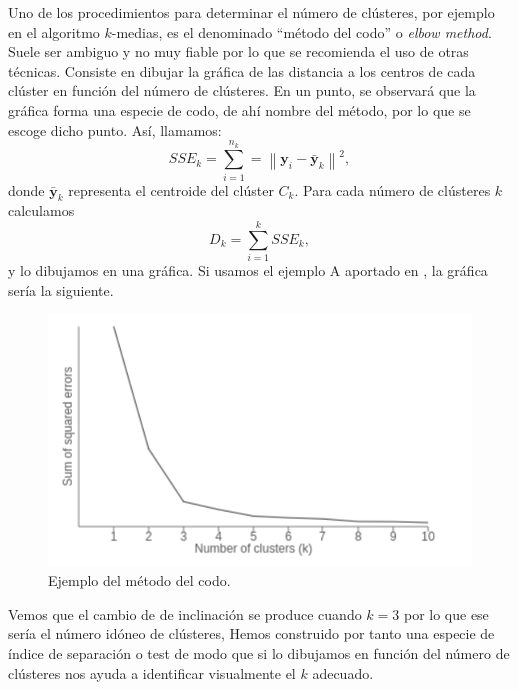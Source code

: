 \documentclass[a4paper, 20pt]{article}
\newcommand{\norm}[1]{\left\lVert#1\right\rVert}
\newcommand{\yy}{\textbf{y}}
\begin{document}
{Uno de los procedimientos para determinar el número de clústeres, por ejemplo en el algoritmo $ k$-medias, es el denominado ``método del codo'' o \textit{elbow method}. Suele ser ambiguo y no muy fiable por lo que se recomienda el uso de otras técnicas. Consiste en dibujar la gráfica de las distancia a los centros de cada clúster en función del número de clústeres. En un punto, se observará que la gráfica forma una especie de codo, de ahí nombre del método, por lo que se escoge dicho punto. Así, llamamos:\\
\[
SSE_k = \sum_{i = 1}^{n_k} = \norm{\yy_i - \bar{\yy}_k}^2,
\]
donde $ \bar{\yy}_k $ representa el centroide del clúster $ C_k $. Para cada número de clústeres $ k $ calculamos 
\[
D_k = \sum_{i = 1} ^ {k} SSE_k,
\]
y lo dibujamos en una gráfica. Si usamos el ejemplo A aportado en \cite{elbowGraph}, la gráfica sería la siguiente.

\begin{figure}[h]
	\centering
	\includegraphics[scale=0.6]{pedro/elbowGraph}
	\caption{Ejemplo del método del codo.}
	\label{smkm}
\end{figure}

Vemos que el cambio de de inclinación se produce cuando $ k=3 $ por lo que ese sería el número idóneo de clústeres, Hemos construido por tanto una especie de índice de separación o test de modo que si lo dibujamos en función del número de clústeres nos ayuda a identificar visualmente el $ k $ adecuado. \\

}
\end{document}
